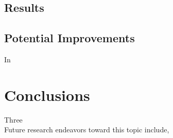 \documentclass[conference]{IEEEtran}
\begin{document}
\subsection{Results}




\subsection{Potential Improvements}
In 




\section{Conclusions} \label{Conclusions}
Three \\
\indent
Future research endeavors toward this topic include, 
\end{document}
